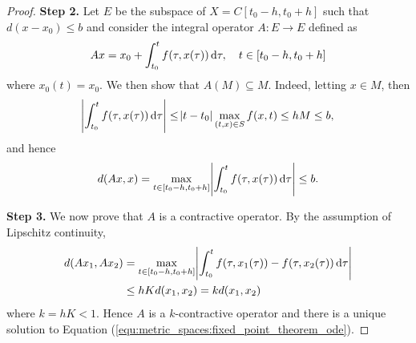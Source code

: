 \begin{example}
\begin{proof}
\textbf{Step 2.}
Let $E$ be the subspace of $X = C[t_0 - h, t_0 + h]$ such that 
$d(x - x_0) \le b$ and consider the integral operator $A: E \to E$ 
defined as  
\begin{equation*}
    Ax = x_0 + \int_{t_0}^{t} f(\tau, x(\tau)) \mathop{}\!\mathrm{d} \tau, \quad
    t \in [t_0 - h, t_0 + h]
\end{equation*}
where $x_0(t) = x_0$. 
We then show that $A(M) \subseteq M$. 
Indeed, letting $x \in M$, then 
\begin{equation*}
        \abs{\int_{t_0}^{t} f(\tau, x(\tau)) \mathop{}\!\mathrm{d} \tau} 
        \le \abs{t - t_0} \max_{(t, x) \in S} f(x, t)
        \le h M \le b, 
\end{equation*}
and hence 
\begin{equation*}
    d(Ax, x) = \max_{t \in [t_0 - h, t_0 + h]} 
    \abs{\int_{t_0}^{t} f(\tau, x(\tau)) \mathop{}\!\mathrm{d} \tau} \le b. 
\end{equation*}

\textbf{Step 3.}
We now prove that $A$ is a contractive operator. 
By the assumption of Lipschitz continuity, 
\begin{equation*}
    \begin{aligned}
        d(Ax_1, Ax_2) &= \max_{t \in [t_0 - h, t_0 + h]}
        \abs{\int_{t_0}^{t} f(\tau, x_1(\tau))
        - f(\tau, x_2(\tau)) \mathop{}\!\mathrm{d} \tau} \\ 
        &\le h K d(x_1, x_2) = k d(x_1, x_2) 
    \end{aligned}
\end{equation*}
where $k = hK < 1$. 
Hence $A$ is a $k$-contractive operator and there is a unique solution to 
Equation (\ref{equ:metric_spaces:fixed_point_theorem_ode}). 
\end{proof}
\end{example}

